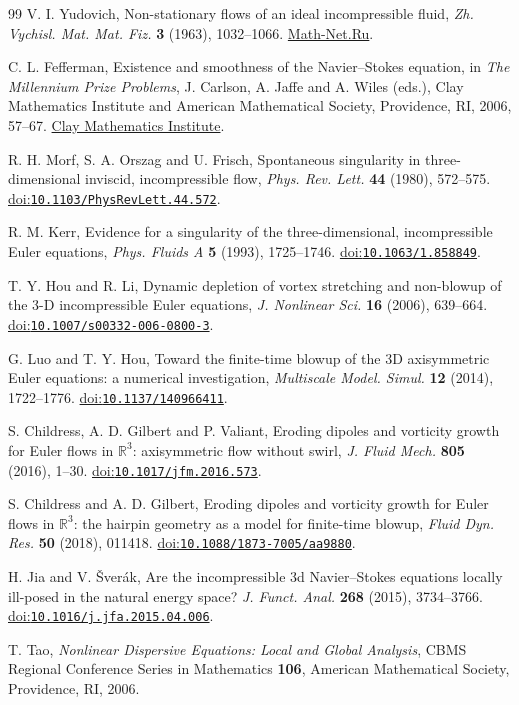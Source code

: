 \begin{thebibliography}{99}
 V. I. Yudovich,
Non-stationary flows of an ideal incompressible fluid,
\emph{Zh. Vychisl. Mat. Mat. Fiz.} \textbf{3} (1963), 1032--1066.
\href{https://www.mathnet.ru/eng/zvmmf7821}{Math-Net.Ru}.

 C. L. Fefferman,
Existence and smoothness of the Navier--Stokes equation,
in \emph{The Millennium Prize Problems}, J. Carlson, A. Jaffe and
A. Wiles (eds.), Clay Mathematics Institute and American Mathematical
Society, Providence, RI, 2006, 57--67.
\href{https://www.claymath.org/wp-content/uploads/2022/06/navierstokes.pdf}{Clay Mathematics Institute}.

 R. H. Morf, S. A. Orszag and U. Frisch,
Spontaneous singularity in three-dimensional inviscid, incompressible flow,
\emph{Phys. Rev. Lett.} \textbf{44} (1980), 572--575.
\href{https://doi.org/10.1103/PhysRevLett.44.572}{doi:\nolinkurl{10.1103/PhysRevLett.44.572}}.

 R. M. Kerr,
Evidence for a singularity of the three-dimensional, incompressible Euler
equations, \emph{Phys. Fluids A} \textbf{5} (1993), 1725--1746.
\href{https://doi.org/10.1063/1.858849}{doi:\nolinkurl{10.1063/1.858849}}.

 T. Y. Hou and R. Li,
Dynamic depletion of vortex stretching and non-blowup of the 3-D
incompressible Euler equations,
\emph{J. Nonlinear Sci.} \textbf{16} (2006), 639--664.
\href{https://doi.org/10.1007/s00332-006-0800-3}{doi:\nolinkurl{10.1007/s00332-006-0800-3}}.

 G. Luo and T. Y. Hou,
Toward the finite-time blowup of the 3D axisymmetric Euler equations:
a numerical investigation,
\emph{Multiscale Model. Simul.} \textbf{12} (2014), 1722--1776.
\href{https://doi.org/10.1137/140966411}{doi:\nolinkurl{10.1137/140966411}}.

 S. Childress, A. D. Gilbert and P. Valiant,
Eroding dipoles and vorticity growth for Euler flows in $\mathbb R^3$:
axisymmetric flow without swirl,
\emph{J. Fluid Mech.} \textbf{805} (2016), 1--30.
\href{https://doi.org/10.1017/jfm.2016.573}{doi:\nolinkurl{10.1017/jfm.2016.573}}.

 S. Childress and A. D. Gilbert,
Eroding dipoles and vorticity growth for Euler flows in $\mathbb R^3$:
the hairpin geometry as a model for finite-time blowup,
\emph{Fluid Dyn. Res.} \textbf{50} (2018), 011418.
\href{https://doi.org/10.1088/1873-7005/aa9880}{doi:\nolinkurl{10.1088/1873-7005/aa9880}}.

 H. Jia and V. \v{S}ver\'ak,
Are the incompressible 3d Navier--Stokes equations locally ill-posed in
the natural energy space?
\emph{J. Funct. Anal.} \textbf{268} (2015), 3734--3766.
\href{https://doi.org/10.1016/j.jfa.2015.04.006}{doi:\nolinkurl{10.1016/j.jfa.2015.04.006}}.

 T. Tao,
\emph{Nonlinear Dispersive Equations: Local and Global Analysis},
CBMS Regional Conference Series in Mathematics \textbf{106},
American Mathematical Society, Providence, RI, 2006.
\end{thebibliography}
